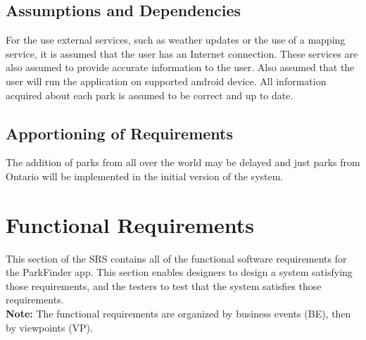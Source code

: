 \documentclass[titlepage]{article}
\begin{document}
\subsection{Assumptions and Dependencies}
\label{sub:assumptions_and_dependencies}
For the use external services, such as weather updates or the use of a mapping service, it is
assumed that the user has an Internet connection. These services are also assumed to provide
accurate information to the user. Also assumed that the user will run the application on supported
android device. All information acquired about each park is assumed to be correct and up to date. 

\subsection{Apportioning of Requirements}
\label{sub:apportioning_of_requirements}
The addition of parks from all over the world may be delayed and just parks from Ontario will be
implemented in the initial version of the system.


\section{Functional Requirements}
\label{sec:functional_requirements}
This section of the SRS contains all of the functional software requirements for the ParkFinder app.
This section enables designers to design a system satisfying those requirements, and the testers to
test that the system satisfies those requirements.\\
\textbf{Note: } The functional requirements are organized by business events (BE), then by
viewpoints (VP).
\end{document}
